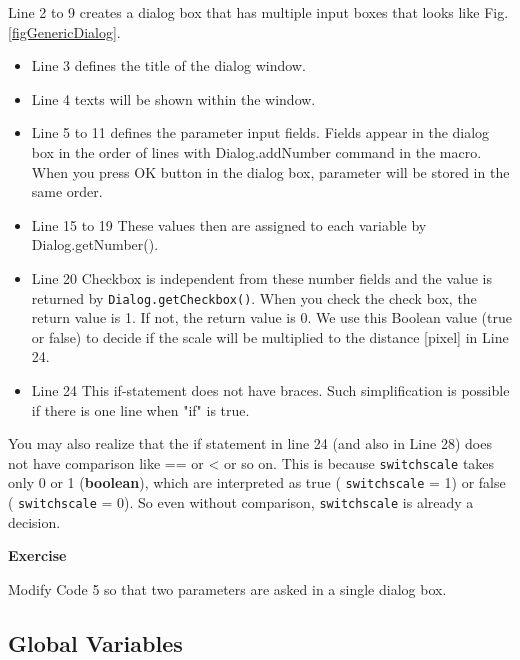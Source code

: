 \documentclass[11pt,a4paper,oneside]{report}
\newenvironment{indentexercise}[1]%
{{\setlength{\leftmargin}{2em}}%
\textbf{Exercise \thesubsection-#1}%
\begin{list}{}%
	\item%
}
{\end{list}}
\newcommand{\ilcom}[1]{\texttt{\small#1}}
\begin{document}
Line 2 to 9 creates a dialog box that has multiple input boxes that looks like Fig. \ref{figGenericDialog}. 

\begin{itemize}
\item Line 3 defines the title of the dialog window. 


\item Line 4 texts will be shown within the window. 

\item Line 5 to 11 defines the parameter input fields. Fields appear in the dialog box in the order of lines with Dialog.addNumber command in the macro. When you press OK button in the dialog box, parameter will be stored in the same order. 

\item Line 15 to 19 These values then are assigned to each variable by Dialog.getNumber(). 

\item Line 20 Checkbox is independent from these number fields and the value is returned by \ilcom{Dialog.getCheckbox()}. When you check the check box, the return value is 1. If not, the return value is 0. We use this Boolean value (true or false)  to decide if the scale will be multiplied to the distance [pixel] in Line 24.

\item Line 24 This if-statement does not have braces. Such simplification is possible if there is one line when "if" is true.  
\end{itemize}

You may also realize that the if statement in line 24 (and also in Line 28) does not have comparison like == or <  or so on. This is because \ilcom{switchscale} takes only 0 or 1 (\textbf{boolean}), which are interpreted as true ( \ilcom{switchscale} = 1) or false ( \ilcom{switchscale} = 0). So even without comparison, \ilcom{switchscale} is already a decision.  

\begin{indentexercise}{1}
Modify Code 5 so that two parameters are asked in a single dialog box. 
\end{indentexercise}

\subsection{Global Variables}
\end{document}
